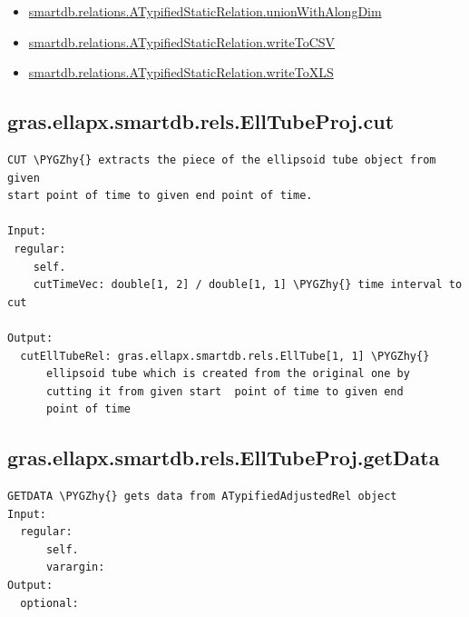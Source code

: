 \documentclass[letterpaper,10pt,english]{sphinxmanual}
\def\PYGZhy{\char`\-}
\begin{document}
\begin{itemize}
\item {} 
{\hyperref[chap_functions:smartdb-relations-atypifiedstaticrelation-unionwithalongdim]{smartdb.relations.ATypifiedStaticRelation.unionWithAlongDim}}

\item {} 
{\hyperref[chap_functions:smartdb-relations-atypifiedstaticrelation-writetocsv]{smartdb.relations.ATypifiedStaticRelation.writeToCSV}}

\item {} 
{\hyperref[chap_functions:smartdb-relations-atypifiedstaticrelation-writetoxls]{smartdb.relations.ATypifiedStaticRelation.writeToXLS}}

\end{itemize}


\subsection{gras.ellapx.smartdb.rels.EllTubeProj.cut}
\label{chap_functions:gras-ellapx-smartdb-rels-elltubeproj-cut}
\begin{Verbatim}[commandchars=\\\{\}]
CUT \PYGZhy{} extracts the piece of the ellipsoid tube object from given
start point of time to given end point of time.

Input:
 regular:
    self.
    cutTimeVec: double[1, 2] / double[1, 1] \PYGZhy{} time interval to cut

Output:
  cutEllTubeRel: gras.ellapx.smartdb.rels.EllTube[1, 1] \PYGZhy{}
      ellipsoid tube which is created from the original one by
      cutting it from given start  point of time to given end
      point of time
\end{Verbatim}


\subsection{gras.ellapx.smartdb.rels.EllTubeProj.getData}
\label{chap_functions:gras-ellapx-smartdb-rels-elltubeproj-getdata}
\begin{Verbatim}[commandchars=\\\{\}]
GETDATA \PYGZhy{} gets data from ATypifiedAdjustedRel object
Input:
  regular:
      self.
      varargin:
Output:
  optional:
\end{Verbatim}
\end{document}
